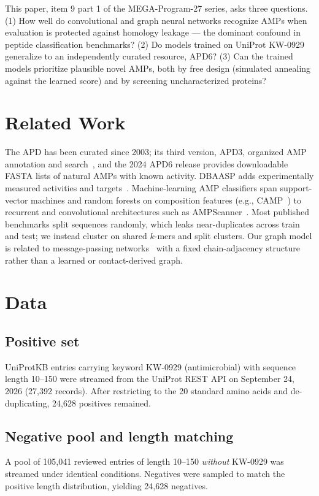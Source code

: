 \documentclass[12pt]{article}
\newcommand{\Npos}{24{,}628}
\newcommand{\Nneg}{24{,}628}
\begin{document}
This paper, item 9 part 1 of the MEGA-Program-27 series, asks three questions.
(1) How well do convolutional and graph neural networks recognize AMPs when
evaluation is protected against homology leakage --- the dominant confound in
peptide classification benchmarks? (2) Do models trained on UniProt KW-0929
generalize to an independently curated resource, APD6? (3) Can the trained
models prioritize plausible novel AMPs, both by free design (simulated
annealing against the learned score) and by screening uncharacterized
proteins?



\section{Related Work}
The APD has been curated since 2003; its third version, APD3, organized AMP
annotation and search~\cite{apd3}, and the 2024 APD6 release provides
downloadable FASTA lists of natural AMPs with known activity. DBAASP adds
experimentally measured activities and targets~\cite{dbaasp}. Machine-learning
AMP classifiers span support-vector machines and random forests on
composition features (e.g., CAMP~\cite{camp}) to recurrent and convolutional
architectures such as AMPScanner~\cite{ampscanner}. Most published benchmarks
split sequences randomly, which leaks near-duplicates across train and test;
we instead cluster on shared $k$-mers and split clusters. Our graph model is
related to message-passing networks~\cite{gilmer2017} with a fixed
chain-adjacency structure rather than a learned or contact-derived graph.



\section{Data}
\subsection{Positive set}
UniProtKB entries carrying keyword KW-0929 (antimicrobial) with
sequence length 10--150 were streamed from the UniProt REST API on
September 24, 2026 (27{,}392 records). After restricting to the 20 standard
amino acids and de-duplicating, \Npos{} positives remained.

\subsection{Negative pool and length matching}
A pool of 105{,}041 reviewed entries of length 10--150 \emph{without} KW-0929
was streamed under identical conditions. Negatives were sampled to match the
positive length distribution, yielding \Nneg{} negatives.
\end{document}
